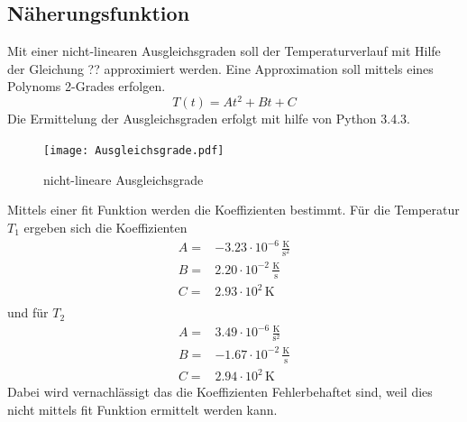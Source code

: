 \subsection{Näherungsfunktion}
Mit einer nicht-linearen Ausgleichsgraden soll der Temperaturverlauf mit Hilfe der Gleichung ?? approximiert werden. Eine Approximation soll mittels eines Polynoms 2-Grades erfolgen.
\begin{equation}
  T(t) = At^2 + Bt +C
  \label{eqn:ausgleichsgrade}
\end{equation}
Die Ermittelung der Ausgleichsgraden erfolgt mit hilfe von Python 3.4.3.
\begin{figure}
  \centering
  \texttt{[image: Ausgleichsgrade.pdf]}
  \caption{nicht-lineare Ausgleichsgrade}
  \label{fig:ausg}
\end{figure}
Mittels einer fit Funktion werden die Koeffizienten bestimmt. Für die Temperatur $T_\text{1}$ ergeben sich die Koeffizienten
\begin{eqnarray}
  A =& -3.23 \cdot 10^{-6} \, \frac{\text{K}}{\text{s}^2}	\\
  B =& 2.20 \cdot 10^{-2} \, \frac{\text{K}}{\text{s}} 	\\
  C =& 2.93 \cdot 10^{2} \, \text{K} \\
  \label{eqn:koefT1}
\end{eqnarray}
und für $T_\text{2}$
\begin{eqnarray}
  A =& 3.49 \cdot 10^{-6} \, \frac{\text{K}}{\text{s}^2} 	\\
  B =& -1.67 \cdot 10^{-2} \, \frac{\text{K}}{\text{s}} 	\\
  C =& 2.94 \cdot 10^2 \, \text{K}
  \label{eqn:koefT2}
\end{eqnarray}
Dabei wird vernachlässigt das die Koeffizienten Fehlerbehaftet sind, weil dies nicht mittels fit Funktion ermittelt werden kann.
